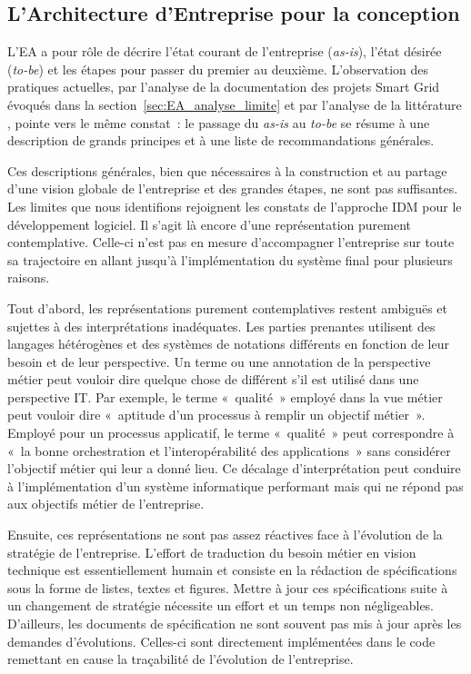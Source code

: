 	\subsection{L'Architecture d'Entreprise pour la conception}

 L'EA a pour rôle de décrire l'état courant de l'entreprise (\textit{as-is}),
l'état désirée (\textit{to-be}) et les étapes pour passer du premier au
deuxième. L'observation des pratiques actuelles, par l'analyse de la
documentation des projets Smart Grid évoqués dans la
section~\ref{sec:EA_analyse_limite} et par l'analyse de la littérature , pointe
vers le même constat~: le passage du \textit{as-is} au \textit{to-be} se résume
à une description de grands principes et à une liste de recommandations
générales.

 Ces descriptions générales, bien que nécessaires à la construction et au
partage d'une vision globale de l'entreprise et des grandes étapes, ne sont pas
suffisantes. Les limites que nous identifions rejoignent les constats de
l'approche IDM pour le développement logiciel. Il s'agit là encore d'une
représentation purement contemplative. Celle-ci n'est pas en mesure
d'accompagner l'entreprise sur toute sa trajectoire en allant jusqu'à
l'implémentation du système final pour plusieurs raisons.

 Tout d'abord, les représentations purement contemplatives restent ambiguës
et sujettes à des interprétations inadéquates. Les parties prenantes utilisent
des langages hétérogènes et des systèmes de notations différents en fonction de
leur besoin et de leur perspective. Un terme ou une annotation de la
perspective métier peut vouloir dire quelque chose de différent s'il est
utilisé dans une perspective IT. Par exemple, le terme «~qualité~» employé dans
la vue métier peut vouloir dire «~aptitude d'un processus à remplir un objectif
métier~». Employé pour un processus applicatif, le terme «~qualité~» peut
correspondre à «~la bonne orchestration et l'interopérabilité des
applications~» sans considérer l'objectif métier qui leur a donné lieu. Ce
décalage d'interprétation peut conduire à l'implémentation d'un système
informatique performant mais qui ne répond pas aux objectifs métier de
l'entreprise.

Ensuite, ces représentations ne sont pas assez réactives face à l'évolution
de la stratégie de l'entreprise. L'effort de traduction du besoin métier en
vision technique est essentiellement humain et consiste en la rédaction de
spécifications sous la forme de listes, textes et figures. Mettre à jour ces
spécifications suite à un changement de stratégie nécessite un effort et un
temps non négligeables. D'ailleurs, les documents de spécification ne sont
souvent pas mis à jour après les demandes d'évolutions. Celles-ci sont
directement implémentées dans le code remettant en cause la traçabilité de
l'évolution de l'entreprise.


